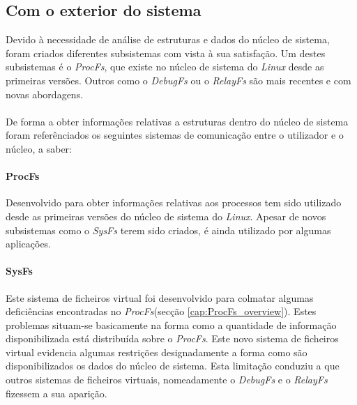 \subsection{Com o exterior do sistema}
% 

Devido à necessidade de análise de estruturas e dados do núcleo de sistema, foram criados diferentes subsistemas com vista à sua satisfação.
Um destes subsistemas é o \textit{ProcFs}, que existe no núcleo de sistema do \textit{Linux} desde as primeiras versões.
Outros como o \textit{DebugFs} ou o \textit{RelayFs} são mais recentes e com novas abordagens.

\paragraph*{}
De forma a obter informações relativas a estruturas dentro do núcleo de sistema foram referênciados os seguintes sistemas de comunicação entre o utilizador e o núcleo, a saber:

\paragraph*{ProcFs}\label{cap:ProcFs_overview}

Desenvolvido para obter informações relativas aos processos tem sido utilizado desde as primeiras versões do núcleo de sistema do \textit{Linux}.
Apesar de novos subsistemas como o \textit{SysFs} terem sido criados, é ainda utilizado por algumas aplicações.

\paragraph*{SysFs}\label{cap:SysFs_overview}

Este sistema de ficheiros virtual foi desenvolvido para colmatar algumas deficiências encontradas no \textit{ProcFs}(secção \ref{cap:ProcFs_overview}).
Estes problemas situam-se basicamente na forma como a quantidade de informação disponibilizada está distribuída sobre o \textit{ProcFs}.
Este novo sistema de ficheiros virtual evidencia algumas restrições designadamente a forma como são disponibilizados os dados do núcleo de sistema.
Esta limitação conduziu a que outros sistemas de ficheiros virtuais, nomeadamente o \textit{DebugFs} e o \textit{RelayFs} fizessem a sua aparição.

